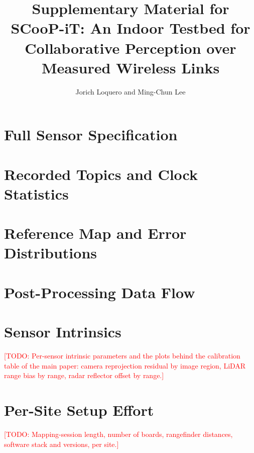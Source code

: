 \documentclass[journal]{IEEEtran}
\newcommand{\todo}[1]{\textcolor{red}{[TODO: #1]}}
\begin{document}
\title{Supplementary Material for\\SCooP-iT: An Indoor Testbed for Collaborative Perception over Measured Wireless Links}
\author{Jorich Loquero and Ming-Chun Lee}
\maketitle

\section{Full Sensor Specification}


\section{Recorded Topics and Clock Statistics}



\section{Reference Map and Error Distributions}




\section{Post-Processing Data Flow}


\section{Sensor Intrinsics}
\todo{Per-sensor intrinsic parameters and the plots behind the
calibration table of the main paper: camera reprojection residual by
image region, LiDAR range bias by range, radar reflector offset by
range.}
%

\section{Per-Site Setup Effort}
\todo{Mapping-session length, number of boards, rangefinder distances,
software stack and versions, per site.}



\end{document}
